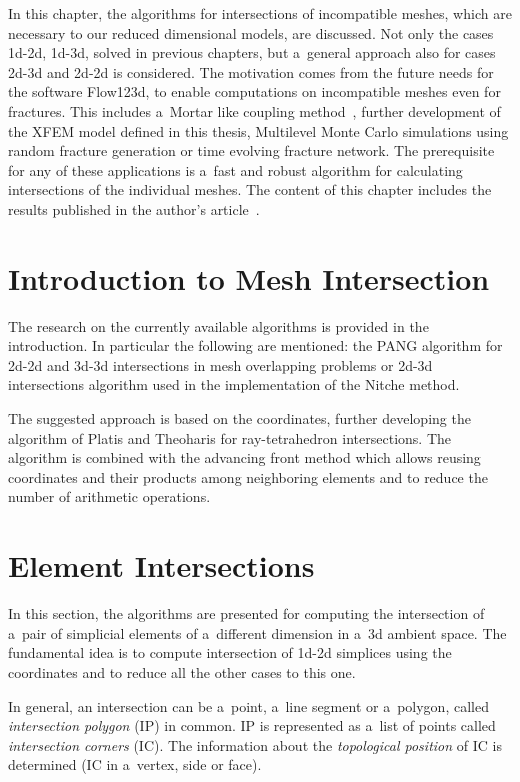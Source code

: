 
In this chapter, the algorithms for intersections of incompatible meshes, which are necessary to our reduced dimensional models, are discussed.
Not only the cases 1d-2d, 1d-3d, solved in previous chapters, but a~general approach also for cases 2d-3d and 2d-2d is considered.
The motivation comes from the future needs for the software Flow123d, to enable computations on incompatible meshes even for fractures.
This includes a~Mortar like coupling method~\cite{brezina_2012}, further development of the XFEM model defined in this thesis,
Multilevel Monte Carlo \cite{giles_mlmc_2015} simulations using random fracture generation or time evolving fracture network.
The prerequisite for any of these applications is a~fast and robust algorithm for calculating intersections of the individual meshes.
The content of this chapter includes the results published in the author's article~\cite{brezina_2017}.


\section{Introduction to Mesh Intersection}

The research on the currently available algorithms is provided in the introduction.
In particular the following are mentioned: the PANG algorithm \cite{gander_algorithm_2013} for 2d-2d and 3d-3d intersections in mesh overlapping problems or
2d-3d intersections algorithm \cite{massing_efficient_2013} used in the implementation of the Nitche method.

The suggested approach is based on the \plucker coordinates, further developing the algorithm of Platis and Theoharis \cite{platis_fast_2003}
for ray-tetrahedron intersections. The algorithm is combined with the advancing front method which allows reusing \plucker coordinates
and their products among neighboring elements and to reduce the number of arithmetic operations. 

\section{Element Intersections}
\label{sec:element intersecitons}
In this section, the algorithms are presented for computing the intersection of a~pair of simplicial elements
of a~different dimension in a~3d ambient space. The fundamental idea is to compute intersection of 1d-2d 
simplices using the \plucker coordinates and to reduce all the other cases to this one. 

In general, an intersection can be a~point, a~line segment or a~polygon, called \emph{intersection polygon} (IP) in common.
IP is represented as a~list of points called \emph{intersection corners} (IC).
The information about the \emph{topological position} of IC is determined (IC in a~vertex, side or face).

